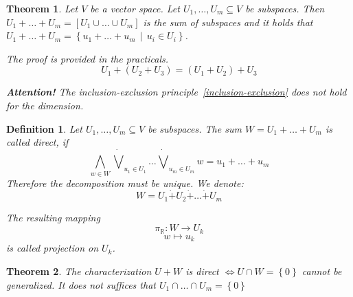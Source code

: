 \documentclass[a4paper,landscape,twocolumn]{article}
\newcommand\set[1]{\left\{#1\right\}}
\newcommand\setdef[2]{\left\{#1\,\middle|\,#2\right\}}
\newtheorem{theorem}{Theorem}[section]
\newtheorem{defi}{Definition}[section]
\begin{document}
\begin{theorem}
  \label{satz-4-12}
  Let $V$ be a vector space. Let $U_1, \dots, U_m \subseteq V$ be subspaces.
  Then $U_1 + \dots + U_m = [U_1 \cup \dots \cup U_m]$ is the \emph{sum of subspaces}
  and it holds that $U_1 + \dots + U_m = \setdef{u_1 + \dots + u_m}{u_i \in U_i}$.

  The proof is provided in the practicals.
  \[ U_1 + (U_2 + U_3) = (U_1 + U_2) + U_3 \]

  \textbf{Attention!}
  The inclusion-exclusion principle~\ref{inclusion-exclusion} does not hold for the dimension.
\end{theorem}

\begin{defi}
  Let $U_1, \dots, U_m \subseteq V$ be subspaces.
  The sum $W = U_1 + \dots + U_m$ is called \emph{direct}, if
  \[ \bigwedge_{w \in W} \dot\bigvee_{u_1 \in U_1} \dots \dot\bigvee_{u_m \in U_m} w = u_1 + \dots + u_m \]
  Therefore the decomposition must be unique. We denote:
  \[ W = U_1 \dot{+} U_2 \dot{+} \dots \dot{+} U_m \]

  The resulting mapping
  \[ \pi_{\mathbb R}: W \rightarrow U_k \]
  \[ w \mapsto u_k \]
  is called \emph{projection} on $U_k$.
\end{defi}

\begin{theorem}
  The characterization $U + W$ is direct $\iff U \cap W = \set{0}$
  cannot be generalized.
  It does not suffices that $U_1 \cap \dots \cap U_m = \set{0}$
\end{theorem}
\end{document}
